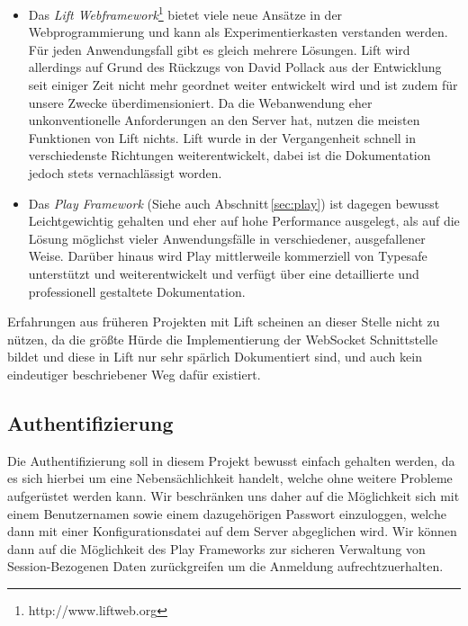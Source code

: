 \begin{itemize}

  \item Das \textit{Lift Webframework}\footnote{http://www.liftweb.org} bietet viele neue Ansätze in
der Webprogrammierung und kann als Experimentierkasten verstanden werden. Für jeden Anwendungsfall
gibt es gleich mehrere Lösungen. Lift wird allerdings auf Grund des Rückzugs von David Pollack aus
der Entwicklung seit einiger Zeit nicht mehr geordnet weiter entwickelt wird und ist zudem für
unsere Zwecke überdimensioniert. Da die Webanwendung eher unkonventionelle Anforderungen an den
Server hat, nutzen die meisten Funktionen von Lift nichts. Lift wurde in der Vergangenheit schnell
in verschiedenste Richtungen weiterentwickelt, dabei ist die Dokumentation jedoch stets
vernachlässigt worden.


  \item Das \textit{Play Framework} (Siehe auch Abschnitt\,\ref{sec:play}) ist dagegen bewusst
Leichtgewichtig gehalten und eher auf hohe Performance ausgelegt, als auf die Lösung möglichst
vieler Anwendungsfälle in verschiedener, ausgefallener Weise. Darüber hinaus wird Play mittlerweile
kommerziell von Typesafe unterstützt und weiterentwickelt und verfügt über eine detaillierte und
professionell gestaltete Dokumentation. \cite{play}

\end{itemize}

Erfahrungen aus früheren Projekten mit Lift scheinen an dieser Stelle nicht zu nützen, da die größte
Hürde die Implementierung der WebSocket Schnittstelle bildet und diese in Lift nur sehr spärlich
Dokumentiert sind, und auch kein eindeutiger beschriebener Weg dafür existiert.

\subsection{Authentifizierung}

Die Authentifizierung soll in diesem Projekt bewusst einfach gehalten werden, da es sich hierbei um
eine Nebensächlichkeit handelt, welche ohne weitere Probleme aufgerüstet werden kann. Wir
beschränken uns daher auf die Möglichkeit sich mit einem Benutzernamen sowie einem dazugehörigen
Passwort einzuloggen, welche dann mit einer Konfigurationsdatei auf dem Server abgeglichen wird. Wir
können dann auf die Möglichkeit des Play Frameworks zur sicheren Verwaltung von Session-Bezogenen
Daten zurückgreifen um die Anmeldung aufrechtzuerhalten.

